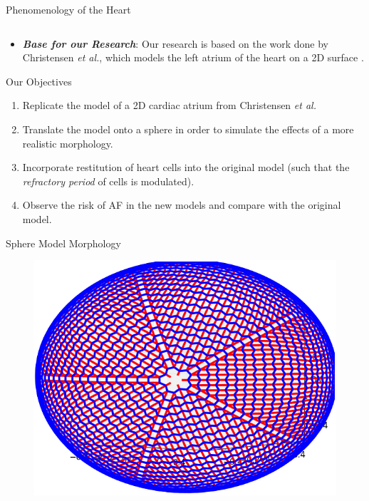 \documentclass[final,hyperref={pdfpagelabels=false}]{beamer}
\begin{document}
\begin{frame}[t]
\begin{columns}[t]
\begin{column}{.465\textwidth}
\begin{block}{Phenomenology of the Heart}
\begin{columns}
\begin{column}{.54\textwidth}
	
	
\end{column}

\end{columns}

	\begin{itemize}
	
	
 \item \textbf{\textit{Base for our Research}}: Our research is based on the work done by Christensen \emph{et al.}, which models the left atrium of the heart on a 2D surface \cite{Christensen}.
	\end{itemize}
\end{block}
\begin{block}{Our Objectives}

\begin{enumerate}
\item Replicate the model of a 2D cardiac atrium from Christensen \emph{et al.}
\item  Translate the model onto a sphere in order to simulate the effects of a more realistic morphology. 
\item Incorporate restitution of heart cells into the original model (such that the \textit{refractory period} of cells is modulated).
\item Observe the risk of AF in the new models and compare with the original model.
\end{enumerate}


\end{block}


\begin{block}{Sphere Model Morphology}

\begin{figure}

\begin{columns}
\begin{column}{.67\textwidth}
\includegraphics[width=0.8\linewidth]{connectome}


\end{column}
\end{columns}
\end{figure}
\end{block}
\end{column}
\end{columns}
\end{frame}
\end{document}
